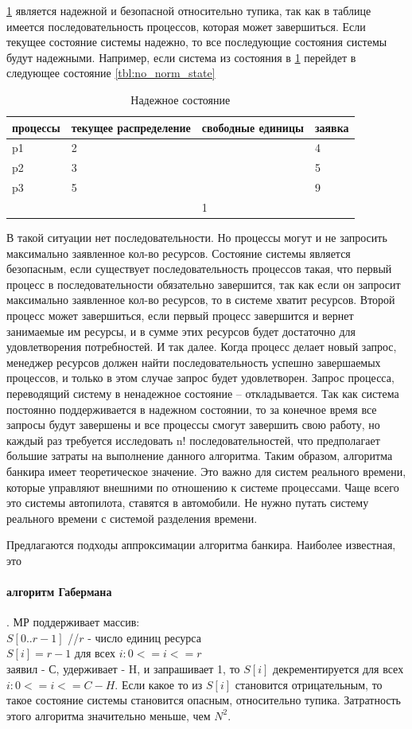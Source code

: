 \ref{tbl:norm_state} является надежной и безопасной относительно тупика, так как в таблице имеется последовательность процессов, которая может завершиться. 
Если текущее состояние системы надежно, то все последующие состояния системы будут надежными. Например, если система из состояния в \ref{tbl:norm_state}  перейдет в следующее состояние \ref{tbl:no_norm_state}

\begin{table}[H]
\caption{Надежное состояние}
\label{tbl:norm_state}
\begin{tabular}{|l|l|l|l|}
\hline
процессы & текущее распределение & свободные единицы & заявка \\
\hline
p1 & 2 &  & 4\\
\hline
p2 & 3 &  & 5\\
\hline
p3 & 5 &  & 9\\
\hline
 &  & 1 & \\
 \hline
\end{tabular}
\end{table}

В такой ситуации нет последовательности.  Но процессы могут и не запросить максимально заявленное кол-во ресурсов. Состояние системы является безопасным, если существует последовательность процессов такая, что первый процесс в последовательности обязательно завершится, так как если он запросит максимально заявленное кол-во ресурсов, то в системе хватит ресурсов. Второй процесс может завершиться, если первый процесс завершится и вернет занимаемые им ресурсы, и в сумме этих ресурсов будет достаточно для удовлетворения потребностей. И так далее. 
Когда процесс делает новый запрос, менеджер ресурсов должен найти последовательность успешно завершаемых процессов, и только в этом случае запрос будет удовлетворен.  Запрос процесса, переводящий систему в ненадежное состояние – откладывается. Так как система постоянно поддерживается в надежном состоянии, то за конечное время все запросы будут завершены и все процессы смогут завершить свою работу, но каждый раз требуется исследовать n! последовательностей, что предполагает большие затраты на выполнение данного алгоритма. Таким образом, алгоритма банкира имеет теоретическое значение.
Это важно для систем реального времени, которые управляют внешними по отношению к системе процессами. Чаще всего это системы автопилота, ставятся в автомобили. Не нужно путать систему реального времени с системой разделения времени. 

Предлагаются подходы аппроксимации алгоритма банкира. Наиболее известная, это \paragraph{алгоритм Габермана}. МР поддерживает массив:\\
$S[0..r-1]$ //$r$ - число единиц ресурса\\
$S[i] = r - 1$ для всех $i: 0 <= i <= r$\\
заявил - С, удерживает - H, и запрашивает 1, то $S[i]$ декрементируется для всех $i: 0 <= i <= C - H$.  Если какое то из $S[i]$ становится отрицательным, то такое состояние системы становится опасным, относительно тупика.
Затратность этого алгоритма значительно меньше, чем $N^2$. 


